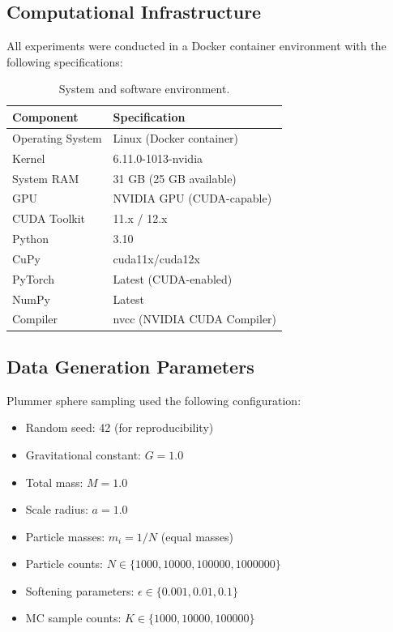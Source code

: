 \documentclass[11pt,a4paper]{article}
\begin{document}
\subsection{Computational Infrastructure}

All experiments were conducted in a Docker container environment with the following specifications:

\begin{table}[H]
  \centering
  \caption{System and software environment.}
  \label{table:environment}
  \begin{tabular}{ll}
    \toprule
    Component & Specification \\
    \midrule
    Operating System & Linux (Docker container) \\
    Kernel & 6.11.0-1013-nvidia \\
    System RAM & 31 GB (25 GB available) \\
    GPU & NVIDIA GPU (CUDA-capable) \\
    CUDA Toolkit & 11.x / 12.x \\
    Python & 3.10 \\
    CuPy & cuda11x/cuda12x \\
    PyTorch & Latest (CUDA-enabled) \\
    NumPy & Latest \\
    Compiler & nvcc (NVIDIA CUDA Compiler) \\
    \bottomrule
  \end{tabular}
\end{table}

\subsection{Data Generation Parameters}

Plummer sphere sampling used the following configuration:
\begin{itemize}
\item Random seed: 42 (for reproducibility)
\item Gravitational constant: $G = 1.0$
\item Total mass: $M = 1.0$
\item Scale radius: $a = 1.0$
\item Particle masses: $m_i = 1/N$ (equal masses)
\item Particle counts: $N \in \{1000, 10000, 100000, 1000000\}$
\item Softening parameters: $\epsilon \in \{0.001, 0.01, 0.1\}$
\item MC sample counts: $K \in \{1000, 10000, 100000\}$
\end{itemize}
\end{document}
